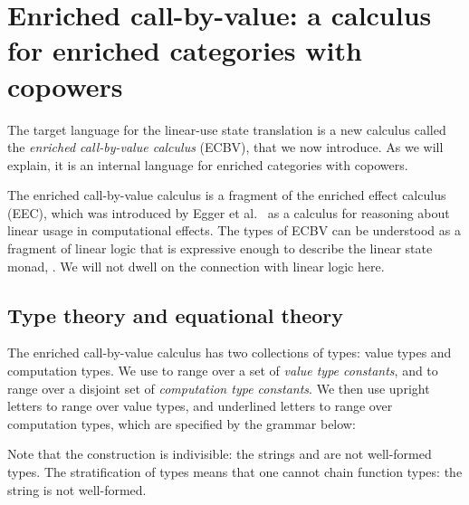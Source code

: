 \documentclass{LMCS}
\begin{document}
\newcommand{\arit}[2]{#1;  #2}
\newcommand{\arityj}[3]{#1: \arit{#2}{#3}}

\newcommand{\Homset}[3]{\mathrm{Hom}_{#1}({#2},{#3})}

\section{Enriched call-by-value: a calculus for enriched categories with copowers}
\label{sec:ecbv}
The target language for the linear-use state translation
is a new calculus called the 
\emph{enriched call-by-value calculus} (ECBV), that we now introduce.
As we will explain, it is an internal language for 
enriched categories with copowers.

The enriched call-by-value calculus 
is a fragment of the enriched effect calculus (EEC),
which was introduced by Egger et al.~\cite{Mogelberg:CSL:09,EEC:journal}
as a calculus for reasoning about linear usage in computational effects.
The types of ECBV
can be understood as a fragment of linear
logic that is expressive enough to describe the 
linear state monad, .
We will not dwell on the connection with linear logic here.

\subsection{Type theory and equational theory}
\label{sec:ecbvsyntax}
The enriched call-by-value calculus has two collections of types:
value types and computation types.  We use 
to range over a set of \emph{value type constants}, and
 to range over a disjoint set of
\emph{computation type constants}.  We then use 
upright letters  to
range over value types, and underlined letters 
 to range over
computation types, which are specified by the grammar below:

\noindent
Note that the construction  is indivisible:
the strings  and  
are not well-formed types.
The stratification of types means that one cannot chain function 
types: the string  is not well-formed.
\end{document}
